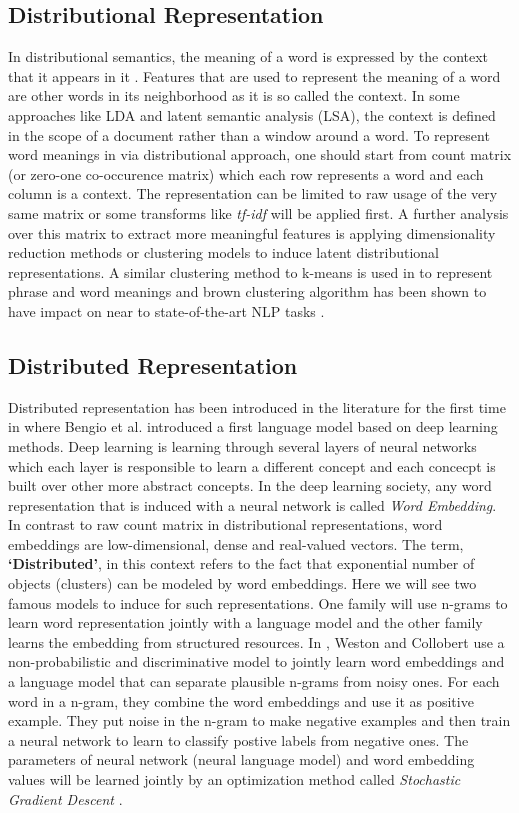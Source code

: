 \subsection{Distributional Representation}
\label{sec:distl-repr}
In distributional semantics, the meaning of a word is expressed by the context
that it appears in it \cite{Harris1981}. Features that are used to represent the
meaning of a word are other words in its neighborhood as it is so called the
context. In some approaches like LDA and latent semantic analysis (LSA), 
the context is defined in the scope of a document rather than a window around a
word. To represent word meanings in via distributional approach, one should
start from count matrix (or zero-one co-occurence matrix) which each row
represents a word and each column is a context. The representation can be
limited to raw usage of the very same matrix or some transforms like
\emph{tf-idf} will be applied first. A further analysis over this matrix to
extract more meaningful features is applying dimensionality reduction methods or
clustering models to induce latent distributional representations. A similar
clustering method to k-means is used in \cite{Lin2009} to represent phrase and
word meanings and brown clustering algorithm \cite{Brown1992} has been shown to
have impact on near to state-of-the-art NLP tasks \cite{Turian2010b}. 


\subsection{Distributed Representation}
\label{sec:disted-repr}
Distributed representation has been introduced in the literature for the first
time in \cite{Bengio2003} where Bengio et al. introduced a first language
model based on deep learning methods\cite{Bengio2009b}. Deep learning is
learning through several layers of neural networks which each layer is
responsible to learn a different concept and each concecpt is built over other
more abstract concepts. In the deep learning society, any word representation
that is induced with a neural network is called \emph{Word Embedding}. 
In contrast to raw count matrix in distributional representations, word embeddings are low-dimensional, dense and real-valued vectors.
 The term, \textbf{`Distributed'}, in this context refers to the fact that
 exponential number of objects (clusters) can be modeled by word embeddings.
 Here we will see two famous models to induce for such representations. One
 family will use n-grams to learn word representation jointly with a language
 model and the other family learns the embedding from structured resources.
In \cite{Collobert2008a}, Weston and Collobert use a non-probabilistic and
discriminative model to jointly learn word embeddings and a language model that
can separate plausible n-grams from noisy ones. For each word in a n-gram, they
combine the word embeddings and use it as positive example. They put noise in
the n-gram to make negative examples and then train a neural network to learn to
classify postive labels from negative ones. The parameters of neural network
(neural language model) and word embedding values will be learned jointly by an
optimization method called \emph{Stochastic Gradient Descent} \cite{Bottou2010}.

